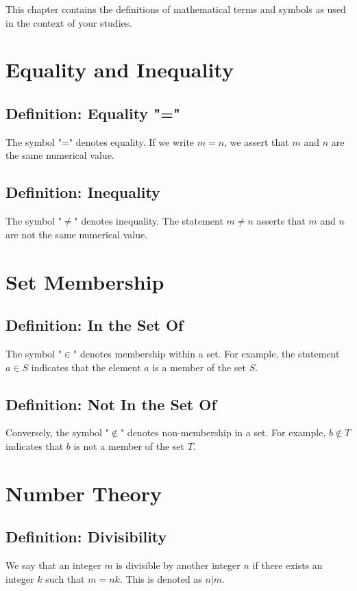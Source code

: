 
This chapter contains the definitions of mathematical terms and symbols as used in the context of your studies.

\section*{Equality and Inequality}

\subsection*{Definition: Equality "="}
The symbol "=" denotes equality. If we write \(m = n\), we assert that \(m\) and \(n\) are the same numerical value.

\subsection*{Definition: Inequality}
The symbol "\(\neq\)" denotes inequality. The statement \(m \neq n\) asserts that \(m\) and \(n\) are not the same numerical value.


\section*{Set Membership}

\subsection*{Definition: In the Set Of}
The symbol "\(\in\)" denotes membership within a set. For example, the statement \(a \in S\) indicates that the element \(a\) is a member of the set \(S\).

\subsection*{Definition: Not In the Set Of}
Conversely, the symbol "\(\notin\)" denotes non-membership in a set. For example, \(b \notin T\) indicates that \(b\) is not a member of the set \(T\).


\section*{Number Theory}

\subsection*{Definition: Divisibility}
We say that an integer \(m\) is divisible by another integer \(n\) if there exists an integer \(k\) such that \(m = nk\). This is denoted as \(n | m\).


